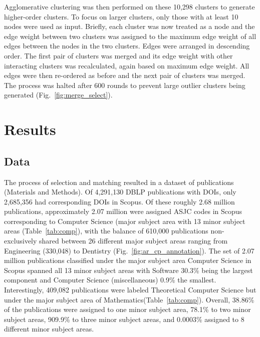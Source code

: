 Agglomerative clustering was then performed on these 10,298 clusters to generate higher-order clusters. To focus on larger clusters, only those with at least 10 nodes were used as input. Briefly, each cluster was now treated as a node and the edge weight between two clusters was assigned to the maximum edge weight of all edges between the nodes in the two clusters. Edges were arranged in descending order. The first pair of clusters was merged and its edge weight with other interacting clusters was recalculated, again based on maximum edge weight. All edges were then re-ordered as before and the next pair of clusters was merged. The process was halted after 600 rounds to prevent large outlier clusters being generated (Fig.~\ref{fig:merge_select}).

\section*{Results}
\label{sec:results}


\subsection{Data}
The process of selection and matching resulted in a dataset of  publications (Materials and Methods). Of 4,291,130 DBLP publications with DOIs, only  2,685,356 had corresponding DOIs in Scopus. Of these roughly 2.68 million publications, approximately 2.07 million were assigned ASJC codes in Scopus corresponding to Computer Science (major subject area with 13 minor subject areas (Table~\ref{tab:comp}), with the balance of 610,000 publications non-exclusively shared between 26 different major subject areas ranging from Engineering (330,048) to Dentistry (Fig.~\ref{fig:ar_cp_annotation}). The set of 2.07 million publications classified under the major subject area Computer Science in Scopus spanned all 13 minor subject areas with Software 30.3\% being the largest component and Computer Science (miscellaneous) 0.9\% the smallest. Interestingly, 409,082  publications were labeled Theoretical Computer Science but under the major subject area of Mathematics(Table~\ref{tab:comp}). Overall, 38.86\% of the publications were assigned to one minor subject area, 78.1\% to two minor subject areas, 909.9\% to three minor subject areas, and 0.0003\% assigned to 8 different minor subject areas. 


